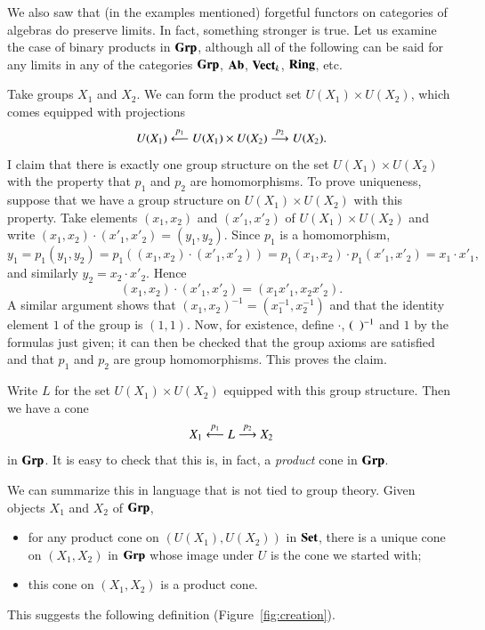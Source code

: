 \begin{example}
\label{eg:gp-creation}
%
%
%
%
We also saw that (in the examples mentioned) forgetful functors on
categories of algebras do preserve limits.  In fact, something stronger is
true.  Let us examine the case of binary products in $\mathbf{Grp}$, although all
of the following can be said for any limits in any of the categories
$\mathbf{Grp}$, $\mathbf{Ab}$, $\mathbf{Vect}_k$, $\mathbf{Ring}$, etc.

Take groups $X_1$ and $X_2$.  We can form the product set $U(X_1) \times
U(X_2)$, which comes equipped with projections
\[
U(X_1) \stackrel{p_1}{\longleftarrow} U(X_1) \times U(X_2) \stackrel{p_2}{\longrightarrow} U(X_2).
\]
I claim that there is exactly one group structure on the set $U(X_1) \times
U(X_2)$ with the property that $p_1$ and $p_2$ are homomorphisms.  To prove
uniqueness, suppose that we have a group structure on $U(X_1) \times U(X_2)$
with this property.  Take elements $(x_1, x_2)$ and $(x'_1, x'_2)$ of
$U(X_1) \times U(X_2)$ and write $(x_1, x_2) \cdot (x'_1, x'_2) = (y_1,
y_2)$.  Since $p_1$ is a homomorphism,
\[
y_1
=
p_1(y_1, y_2)
=
p_1((x_1, x_2) \cdot (x'_1, x'_2))
=
p_1(x_1, x_2) \cdot p_1(x'_1, x'_2)
=
x_1 \cdot x'_1,
\]
and similarly $y_2 = x_2 \cdot x'_2$.  Hence
\[
(x_1, x_2) \cdot (x'_1, x'_2) = (x_1 x'_1, x_2 x'_2).
\]
A similar argument shows that $(x_1, x_2)^{-1} = (x_1^{-1}, x_2^{-1})$ and
that the identity element $1$ of the group is $(1, 1)$.  Now, for
existence, define $\cdot$, $(\hspace*{.5em})^{-1}$ and $1$ by the formulas just
given; it can then be checked that the group axioms are satisfied and that
$p_1$ and $p_2$ are group homomorphisms.  This proves the claim.

Write $L$ for the set $U(X_1) \times U(X_2)$ equipped with this group
structure.  Then we have a cone
\[
X_1 \stackrel{p_1}{\longleftarrow} L \stackrel{p_2}{\longrightarrow} X_2
\]
in $\mathbf{Grp}$.  It is easy to check that this is, in fact, a \emph{product}
cone in $\mathbf{Grp}$.

We can summarize this in language that is not tied to group theory.  Given
objects $X_1$ and $X_2$ of $\mathbf{Grp}$,
%
\begin{itemize}
\item
for any product cone on $(U(X_1), U(X_2))$ in $\mathbf{Set}$, there is a unique
cone on $(X_1, X_2)$ in $\mathbf{Grp}$ whose image under $U$ is the cone we started
with;

\item
this cone on $(X_1, X_2)$ is a product cone.
\end{itemize}
\end{example}
%
This suggests the following definition (Figure~\ref{fig:creation}).

